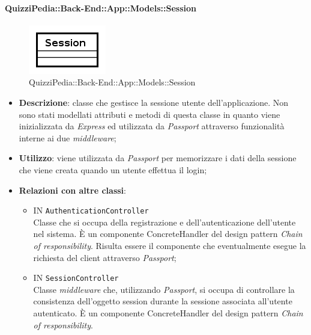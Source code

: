 \paragraph{QuizziPedia::Back-End::App::Models::Session}
\label{QuizziPedia::Back-End::App::Models::Session}
\begin{figure}[ht]
	\centering
	\includegraphics[scale=0.45]{UML/Classi/Back-End/QuizziPedia_Back-End_App_Models_sessionModel.png}
	\caption{QuizziPedia::Back-End::App::Models::Session}
\end{figure}
\FloatBarrier
	\begin{itemize}
		\item \textbf{Descrizione}: classe che gestisce la sessione utente dell'applicazione. Non sono stati modellati attributi e metodi di questa classe in quanto viene inizializzata da \textit{Express} ed utilizzata da \textit{Passport} attraverso funzionalità interne ai due \textit{middleware};
		\item \textbf{Utilizzo}: viene utilizzata da \textit{Passport} per memorizzare i dati della sessione che viene creata quando un utente effettua il login;
		\item \textbf{Relazioni con altre classi}:
			\begin{itemize}
				\item
				IN \texttt{AuthenticationController} \\
				Classe che si occupa della registrazione e dell'autenticazione dell'utente nel sistema. È un componente ConcreteHandler del design pattern \textit{Chain of responsibility}. Risulta essere il componente che eventualmente esegue la richiesta del client attraverso \textit{Passport};			
				\item
				IN \texttt{SessionController} \\
				Classe \textit{middleware} che, utilizzando \textit{Passport}, si occupa di controllare la consistenza dell'oggetto session durante la sessione associata all'utente autenticato. È un componente ConcreteHandler del design pattern \textit{Chain of responsibility}.
			\end{itemize}
	\end{itemize}